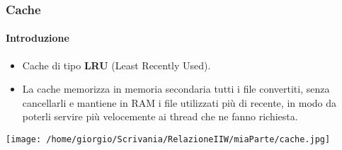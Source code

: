 \documentclass{beamer}
\begin{document}
\begin{frame}
\frametitle{Cache}
\framesubtitle{Introduzione}

\begin{itemize}
\item Cache di tipo \textbf{LRU} (Least Recently Used).
\item La cache memorizza in memoria secondaria tutti i file
convertiti, senza cancellarli e mantiene in RAM i file utilizzati più di recente, in
modo da poterli servire più velocemente ai thread che ne fanno richiesta.
\end{itemize}



\texttt{[image: /home/giorgio/Scrivania/RelazioneIIW/miaParte/cache.jpg]}

\end{frame}
\end{document}
